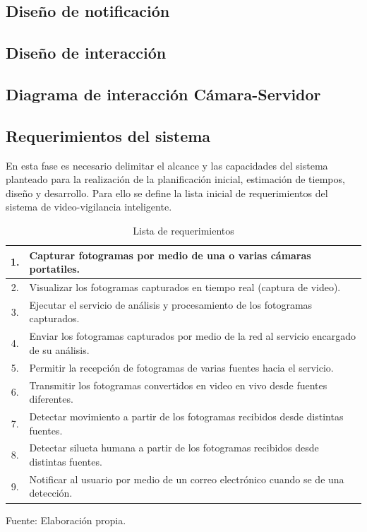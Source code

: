 \subsection{Diseño de notificación}

\subsection{Diseño de interacción}

\subsection{Diagrama de interacción Cámara-Servidor}


\subsection{Requerimientos del sistema}
En esta fase es necesario delimitar el alcance y las capacidades del sistema planteado para la realización de la planificación inicial, estimación de tiempos, diseño y desarrollo. Para ello se define la lista inicial de requerimientos del sistema de video-vigilancia inteligente.\\

\begin{table}[H]
    \caption{Lista de requerimientos}
    \label{tabla:ejemplo}
    \begin{center}
        \begin{tabular}{ |c|l|} 
            \hline
            1. & Capturar fotogramas por medio de una o varias cámaras portatiles.\\ \hline
            2. & Visualizar los fotogramas capturados en tiempo real (captura de video).\\  \hline
            3. & Ejecutar el servicio de análisis y procesamiento de los fotogramas capturados.\\  \hline
            4. & Enviar los fotogramas capturados por medio de la red al servicio encargado de su análisis.\\ \hline
            5. & Permitir la recepción de fotogramas de varias fuentes hacia el servicio.\\ \hline
            6. & Transmitir los fotogramas convertidos en video en vivo desde fuentes diferentes.\\ \hline
            7. & Detectar movimiento a partir de los fotogramas recibidos desde distintas fuentes.\\ \hline
            8. & Detectar silueta humana a partir de los fotogramas recibidos desde distintas fuentes.\\ \hline
            9. & Notificar al usuario por medio de un correo electrónico cuando se de una detección.\\ \hline
        \end{tabular}
    \end{center}
    \begin{center}
        Fuente: Elaboración propia.
    \end{center}
\end{table}

